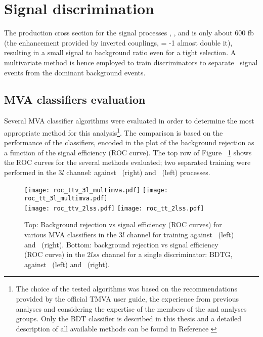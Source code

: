 \section{Signal discrimination }
\label{secc:signal_disc}

The production cross section for the signal processes \tHq, \tHW, and \ttH is only about 600 fb (the enhancement provided by inverted couplings, \Ct = -1 almost double it), resulting in a small signal to background ratio even for a tight selection. A multivariate method is hence employed to train discriminators to separate \tH\ signal events from the dominant background events.

\subsection{MVA classifiers evaluation}

Several MVA classifier algorithms were evaluated in order to determine the most appropriate method for this analysis\footnote{The choice of the tested algorithms was based on the recommendations provided by the official TMVA user guide, the experience from previous analyses and considering the expertise of the members of the \tHq and \ttH analyses groups. Only the BDT classifier is described in this thesis and a detailed description of all available methods can be found in Reference \cite{tmva}}. The comparison is based on the performance of the classifiers, encoded in the plot of the background rejection as a function of the signal efficiency (ROC curve). The top row of Figure ~\ref{roc} shows the ROC curves for the several methods evaluated; two separated training were performed in the $3l$ channel: against \ttbar\ (right) and \ttV\ (left) processes.

\begin{figure} [!h]
  \centering
   \texttt{[image: roc\_ttv\_3l\_multimva.pdf]}
   \texttt{[image: roc\_tt\_3l\_multimva.pdf]} \\
   \texttt{[image: roc\_ttv\_2lss.pdf]}
   \texttt{[image: roc\_tt\_2lss.pdf]} 

\caption[MVA classifiers performance.]{ Top: Background rejection vs signal efficiency (ROC curves) for various MVA classifiers in the $3l$ channel for training against \ttV\ (left) and \ttbar\ (right). Bottom: background rejection vs signal efficiency (ROC curve) in the $2lss$ channel for a single discriminator: BDTG, against \ttV\ (left) and \ttbar\ (right).}
\label{roc}
\end{figure} 

